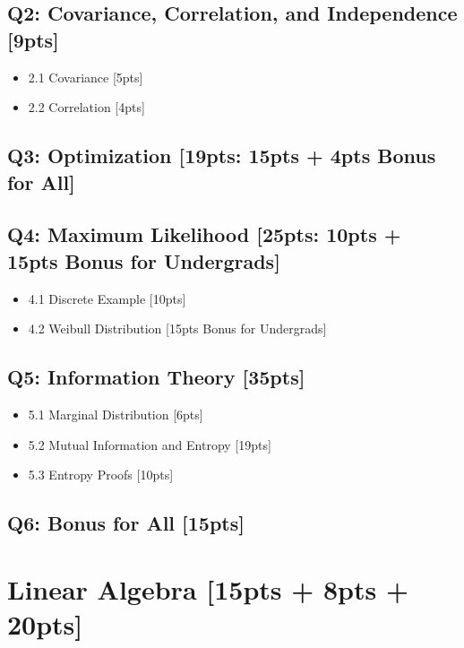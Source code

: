 \documentclass{article}
\begin{document}
\subsection*{Q2: Covariance, Correlation, and Independence [9pts]}
\begin{itemize}
    \item 2.1 Covariance [5pts]
    \item 2.2 Correlation [4pts]
\end{itemize}
\subsection*{Q3: Optimization [19pts: 15pts + 4pts Bonus for All]}
\subsection*{Q4: Maximum Likelihood [25pts: 10pts + 15pts Bonus for Undergrads]}
\begin{itemize}
    \item 4.1 Discrete Example [10pts]
    \item 4.2 Weibull Distribution [15pts Bonus for Undergrads]
\end{itemize}
\subsection*{Q5: Information Theory [35pts]}
\begin{itemize}
    \item 5.1 Marginal Distribution [6pts]
    \item 5.2 Mutual Information and Entropy [19pts]
    \item 5.3 Entropy Proofs [10pts]
\end{itemize}
\subsection*{Q6: Bonus for All [15pts]}
\newpage

\section{Linear Algebra [15pts + 8pts + 20pts]}
\end{document}
